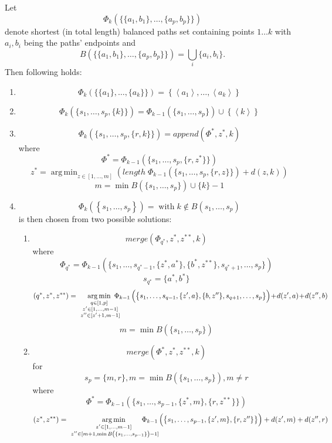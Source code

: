 \documentclass[10pt,a4paper]{scrartcl}
\DeclareMathOperator*{\argmin}{arg\,min}
\begin{document}
Let
\[ \Phi_k\left(\big\{ \{a_1,b_1\}, \ldots ,\{a_p,b_p\} \big\} \right) \]
denote shortest (in total length) balanced paths set containing points $1 \ldots k$
with $a_i, b_i$ being the paths' endpoints
and
\[ B\left(\big\{ \{a_1,b_1\}, \ldots ,\{a_p,b_p\} \big\}\right) = \bigcup_i\{a_i,b_i\}.\]
Then following holds:
\begin{enumerate}
  \item
\[
  \Phi_k\left(\big\{ \{a_1\}, \ldots , \{a_k\} \big\} \right) =
  \left\{ \left< a_1 \right> , \ldots , \left< a_k \right> \right\}
\]
  \item
\[
  \Phi_k\left(\big\{ s_1, \ldots , s_p, \{k\} \big\} \right) =
  \Phi_{k-1}\left(\big\{ s_1, \ldots , s_p \big\}\right) \cup
  \left\{\left<k\right>\right\}
\]
  \item
\[
  \Phi_k\left(\big\{ s_1, \ldots , s_p, \{r,k\} \big\} \right) =
  append\left(\Phi^{*},z^{\ast},k\right)
\]
where
\[
  \Phi^{*} = \Phi_{k-1}\left(\big\{ s_1, \ldots , s_p, \{r,z^{*}\} \big\} \right)
\]
\[
  z^{*} = \argmin_{z \in [1,\ldots,m]}{
    \left(
      length \;
      \Phi_{k-1}\left(\big\{ s_1, \ldots , s_p, \{r,z\} \big\} \right)
      + d(z,k)
    \right)
  }
\]
\[
  m = \min B\left(\{s_1, \ldots ,s_p\}\right) \cup \{k\} - 1
\]
  \item
\[
  \Phi_k\left(\left\{ s_1, \ldots , s_p \right\} \right) =
  \;\text{with}\;
  k \notin B\left({s_1,\ldots,s_p}\right)
\]
is then chosen from two possible solutions:
\begin{enumerate}
  \item
\[
  merge\left(\Phi_{q^{*}},z^{*},z^{**},k\right)
\]
where
\[
  \Phi_{q^{*}} = \Phi_{k-1}\left(\big\{ s_1, \ldots , s_{q^{*}-1},
  \{z^{*},a^{*}\}, \{b^{*},z^{**}\}, s_{q^{*}+1}, \ldots, s_p \big\} \right)
\]
\[
  s_{q^{*}} = \{a^{*},b^{*}\}
\]
\[
  (q^{*}, z^{*},z^{**}) = \argmin_{
    \substack{q \in [1,p] \\\
              z^\prime \in [1,\ldots,m-1] \\\
              z^{\prime\prime} \in [z^\prime+1, m-1]}}{
    \mkern-18mu \Phi_{k-1}\left(\big\{ s_1, \ldots , s_{q-1},
    \{z^{\prime},a\}, \{b,z^{\prime\prime}\},
    s_{q+1}, \ldots ,s_p \big\} \right)
    \! + \! d(z^\prime,a) \! + \! d(z^{\prime\prime},b)
  }
\]
\[
  m = \min B\left(\{s_1,\ldots,s_p\}\right)
\]
  \item
\[
  merge\left(\Phi^{*},z^{*},z^{**},k\right)
\]
for
\[
  s_p = \{m,r\}, m = \min B\left(\{s_1,\ldots,s_p\}\right), m \neq r
\]
where
\[
  \Phi^{*} = \Phi_{k-1}\left(\big\{ s_1, \ldots , s_{p-1}, \{z^{*},m\}, \{r,z^{**}\} \big\} \right)
\]
\[
  (z^{*},z^{**}) = \argmin_{\substack{z^\prime \in [1,\ldots,m-1] \\\
  z^{\prime\prime} \in [m+1, \min B\left(\{s_1,\ldots,s_{p-1}\}\right)-1]}}{
    \mkern-28mu \mkern-18mu
    \Phi_{k-1}\left(\big\{ s_1, \ldots , s_{p-1},
    \{z^{\prime},m\}, \{r,z^{\prime\prime}\} \big\} \right)
    + d(z^\prime,m) + d(z^{\prime\prime},r)
  }
\]
\end{enumerate}
\end{enumerate}
\end{document}
